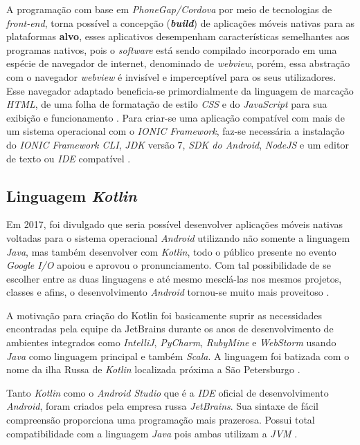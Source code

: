 A programação com base em \textit{PhoneGap/Cordova} por meio de tecnologias de \textit{front-end}, torna possível a concepção (\textbf{\textit{build}}) de aplicações móveis nativas para as plataformas \textbf{alvo}, esses aplicativos desempenham características semelhantes aos programas nativos, pois o \textit{software} está sendo compilado incorporado em uma  espécie de navegador de internet, denominado de \textit{webview}, porém, essa abstração com o navegador \textit{webview} é invisível e imperceptível para os seus utilizadores. Esse navegador adaptado beneficia-se primordialmente da linguagem de marcação \textit{HTML}, de uma folha de formatação de estilo \textit{CSS} e do \textit{JavaScript} para sua exibição e funcionamento \cite{IonicCordovaMedium2017}. Para criar-se uma aplicação compatível com mais de um sistema operacional com o \textit{IONIC Framework}, faz-se necessária a instalação do \textit{IONIC Framework CLI}, \textit{JDK} versão 7, \textit{SDK do Android}, \textit{NodeJS} e um editor de texto ou \textit{IDE} compatível \cite{IONIC2017_ADRIAN_GOIS}.

\subsection{Linguagem \textit{Kotlin}}
Em 2017, foi divulgado que seria possível desenvolver aplicações móveis nativas voltadas para o sistema operacional \textit{Android} utilizando não somente a linguagem \textit{Java}, mas também desenvolver com \textit{Kotlin}, todo o público presente no evento \textit{Google I/O} apoiou e aprovou o pronunciamento. Com tal possibilidade de se escolher entre as duas linguagens e até mesmo mesclá-las nos mesmos projetos, classes e afins, o desenvolvimento \textit{Android} tornou-se muito mais proveitoso \cite{Lecheta2018}.

A motivação para criação do Kotlin foi basicamente suprir as necessidades encontradas pela equipe da JetBrains durante os anos de desenvolvimento de ambientes integrados como \textit{IntelliJ}, \textit{PyCharm}, \textit{RubyMine} e \textit{WebStorm} usando \textit{Java} como linguagem principal e também \textit{Scala}. A linguagem foi batizada com o nome da ilha Russa de \textit{Kotlin} localizada próxima a São Petersburgo \cite{Lecheta2018}.

Tanto \textit{Kotlin} como o  \textit{Android Studio} que é a  \textit{IDE} oficial de desenvolvimento  \textit{Android}, foram criados pela empresa russa  \textit{JetBrains}. Sua sintaxe de fácil compreensão proporciona uma programação mais prazerosa. Possui total compatibilidade com a linguagem \textit{Java} pois ambas utilizam a \textit{JVM} \cite{Lecheta2018}.

